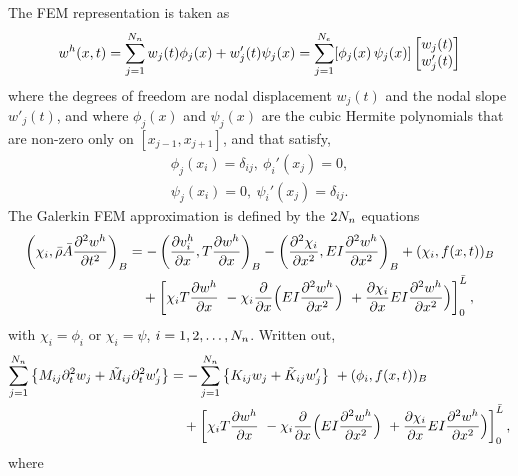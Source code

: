 \documentclass[11pt]{article}
\begin{document}
The FEM representation is taken as 
\begin{align}
  w^h(x,t) = \sum_{j=1}^{N_n} w_j(t) \phi_j(x) + w_j'(t) \psi_j(x)  = \sum_{j=1}^{N_e} [ \phi_j(x)\, \psi_j(x)] \begin{bmatrix} w_j(t)\\w_j'(t)\end{bmatrix}
\end{align}
where the degrees of freedom are nodal displacement $w_j(t)$ and the nodal slope $w'_j(t)$, and where $\phi_j(x)$ and $\psi_j(x)$ are 
the cubic Hermite polynomials 
that are non-zero only on $[x_{j-1},x_{j+1}]$,  and
that satisfy,
\begin{align}
  \phi_j(x_i)=\delta_{ij}, ~ \phi_i'(x_j)=0, \\
  \psi_j(x_i)=0, ~ \psi_i'(x_j)=\delta_{ij}.
\end{align}
% 
The Galerkin FEM approximation is defined by the $2N_n$ equations
\begin{align}
 \left( \chi_i,  \bar{\rho} \bar{A} \frac{\partial^2 w^h}{\partial t^2} \right)_B  &= 
                  - \left( \frac{\partial v^h_i}{\partial x} , T \frac{\partial w^h}{\partial x} \right)_B
                  -\left(\frac{\partial^2 \chi_i}{\partial x^2}, E I \frac{\partial^2 w^h}{\partial x^2}\right)_B  + ( \chi_i, f(x,t))_B \\
             &\quad  +   \left[ \chi_i T \frac{\partial w^h}{\partial x} ~ -\chi_i \frac{\partial}{\partial x}\Big( E I \frac{\partial^2 w^h}{\partial x^2}\Big) 
                      ~ + \frac{\partial \chi_i}{\partial x}E I \frac{\partial^2 w^h}{\partial x^2}\Big)  
                      \right]_0^{\bar{L}} ,  \label{eq:beamFEM_I}
\end{align}
with $\chi_i=\phi_i$ or $\chi_i=\psi$, $i=1,2,\ldots,N_n$. Written out,
\begin{align}
\sum_{j=1}^{N_n} \left\{ M_{ij} \partial_t^2 w_j 
                + \tilde{M}_{ij} \partial_t^2 w'_j \right\}  &= 
     - \sum_{j=1}^{N_n} \left\{  K_{ij} w_j + \tilde{K}_{ij} w'_j \right\} 
                  ~+ ( \phi_i, f(x,t))_B \\
             &\quad  +   \left[ \chi_i T \frac{\partial w^h}{\partial x} ~ - \chi_i \frac{\partial}{\partial x}\Big( E I \frac{\partial^2 w^h}{\partial x^2}\Big) 
                      ~ + \frac{\partial \chi_i}{\partial x}E I \frac{\partial^2 w^h}{\partial x^2}\Big)  
                      \right]_0^{\bar{L}}  ,  \label{eq:beamFEM_II}
\end{align}
where 
\end{document}
